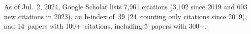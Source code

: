 %
As of Jul.~2, 2024, Google Scholar lists
7,961 citations (3,102 since 2019 and 603 new citations in 2023),
an h-index of~39 (24~counting only citations since 2019),
and 14~papers with 100+~citations, including 5~papers with 300+.

